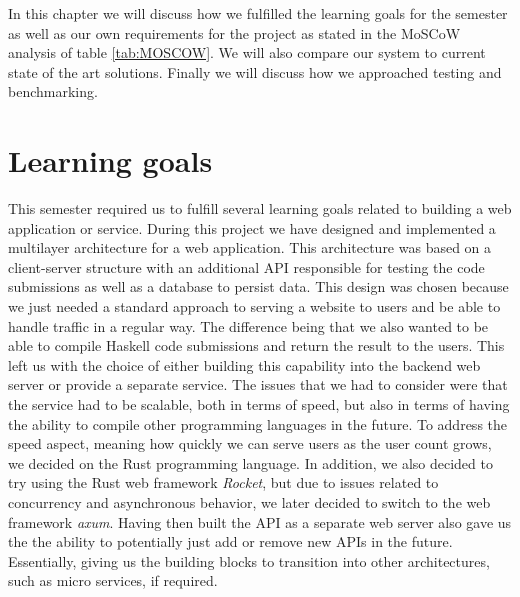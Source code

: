 In this chapter we will discuss how we fulfilled the learning goals for the semester as well as our own requirements for the project as stated in the MoSCoW analysis of table \ref{tab:MOSCOW}. We will also compare our system to current state of the art solutions. Finally we will discuss how we approached testing and benchmarking.

\section{Learning goals}
This semester required us to fulfill several learning goals related to building a web application or service. During this project we have designed and implemented a multilayer architecture for a web application. This architecture was based on a client-server structure with an additional API responsible for testing the code submissions as well as a database to persist data. This design was chosen because we just needed a standard approach to serving a website to users and be able to handle traffic in a regular way. The difference being that we also wanted to be able to compile Haskell code submissions and return the result to the users. This left us with the choice of either building this capability into the backend web server or provide a separate service. The issues that we had to consider were that the service had to be scalable, both in terms of speed, but also in terms of having the ability to compile other programming languages in the future. 
To address the speed aspect, meaning how quickly we can serve users as the user count grows, we decided on the Rust programming language. In addition, we also decided to try using the Rust web framework \textit{Rocket}, but due to issues related to concurrency and asynchronous behavior, we later decided to switch to the web framework \textit{axum}. Having then built the API as a separate web server also gave us the the ability to potentially just add or remove new APIs in the future. Essentially, giving us the building blocks to transition into other architectures, such as micro services, if required.






